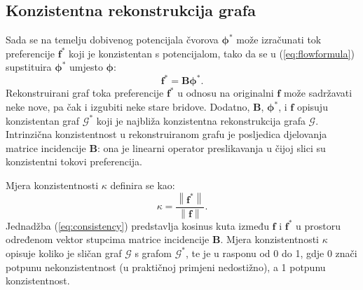 \documentclass[lmodern, utf8, diplomski, numeric]{fer}
\newcommand{\matr}[1]{\mathbold{#1}}
\newcommand{\graph}[1]{\mathcal{#1}}
\newcommand{\q}{\left}
\newcommand{\w}{\right}
\begin{document}
  \subsection{Konzistentna rekonstrukcija grafa}
  \label{sec:reconstruct}
  Sada se na temelju dobivenog potencijala čvorova $\matr{\phi^*}$ može izračunati tok preferencije $\matr{f^*}$ koji je konzistentan s potencijalom, tako da se u (\ref{eq:flowformula}) supstituira $\matr{\phi^*}$ umjesto $\matr{\phi}$:
  \begin{equation}
  \matr{f^*} = \matr{B} \matr{\phi^*}.
  \end{equation}
  Rekonstruirani graf toka preferencije $\matr{f^*}$ u odnosu na originalni $\matr{f}$ može sadržavati neke nove, pa čak i izgubiti neke stare bridove.
  Dodatno, $\matr{B}$, $\matr{\phi^*}$, i $\matr{f}$ opisuju konzistentan graf $\graph{G}^*$ koji je najbliža konzistentna rekonstrukcija grafa $\graph{G}$.
  Intrinzična konzistentnost u rekonstruiranom grafu je posljedica djelovanja matrice incidencije $\matr B$: ona je linearni operator preslikavanja u čijoj slici su konzistentni tokovi preferencija.
  
  Mjera konzistentnosti $\kappa$ definira se kao:
  \begin{equation}
  \label{eq:consistency}
  \kappa = \frac{\q \lVert \matr{f^*} \w \rVert}{\q \lVert \matr{f} \w \rVert}.
  \end{equation}
  Jednadžba (\ref{eq:consistency}) predstavlja kosinus kuta između $\matr{f}$ i $\matr{f^*}$ u prostoru određenom vektor stupcima matrice incidencije $\matr{B}$.
  Mjera konzistentnosti $\kappa$ opisuje koliko je sličan graf $\graph{G}$ s grafom $\graph{G}^*$, te je u rasponu od 0 do 1, gdje 0 znači potpunu nekonzistentnost (u praktičnoj primjeni nedostižno), a 1 potpunu konzistentnost.
  
\end{document}
